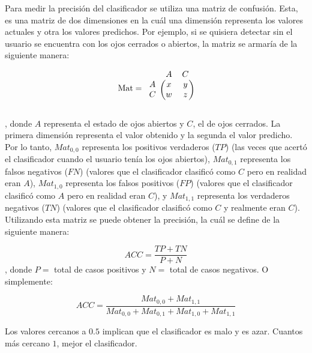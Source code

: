 Para medir la precisión del clasificador se utiliza una matriz de confusión. Esta, es una matriz de dos dimensiones en la cuál una dimensión representa los valores actuales y otra los valores predichos. Por ejemplo, si se quisiera detectar sin el usuario se encuentra con los ojos cerrados o abiertos, la matriz se armaría de la siguiente manera:

\[
\textrm{Mat} = \begin{blockarray}{ccc}
& A & C \\
\begin{block}{c(cc)}
  A & x & y \\
  C & w & z \\
\end{block}
\end{blockarray}
 \]
 
 , donde $ A $ representa el estado de ojos abiertos y $ C $, el de ojos cerrados. La primera dimensión representa el valor obtenido y la segunda el valor predicho. Por lo tanto, $Mat_{0,0}$ representa los positivos verdaderos ($TP$) (las veces que acertó el clasificador cuando el usuario tenía los ojos abiertos), $Mat_{0,1}$ representa los falsos negativos ($FN$) (valores que el clasificador clasificó como $C$ pero en realidad eran $A$), $Mat_{1,0}$ representa los falsos positivos ($FP$) (valores que el clasificador clasificó como $A$ pero en realidad eran $C$), y $Mat_{1,1}$ representa los verdaderos negativos ($TN$) (valores que el clasificador clasificó como $C$ y realmente eran $C$). Utilizando esta matriz se puede obtener la precisión, la cuál se define de la siguiente manera:
 
$$ ACC = \frac{TP + TN}{P + N} $$ 
, donde $P =$ total de casos positivos y $ N =$ total de casos negativos. O simplemente:

$$ ACC = \frac{Mat_{0,0} + Mat_{1,1}}{Mat_{0,0} + Mat_{0,1} + Mat_{1,0} + Mat_{1,1}} $$ 

Los valores cercanos a $0.5$ implican que el clasificador es malo y es azar. Cuantos más cercano $1$, mejor el clasificador.

